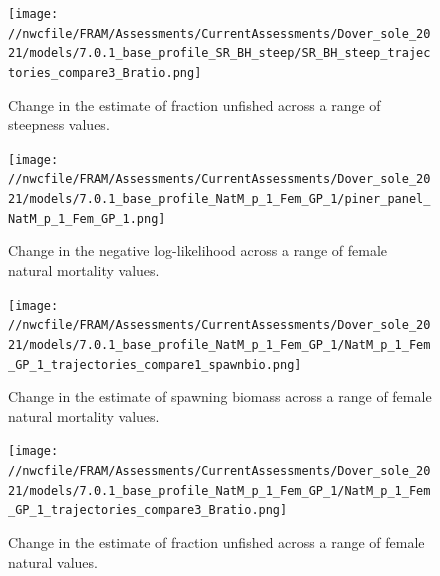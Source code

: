 \documentclass[11pt,
  english,
  a4paper,
]{article}
\begin{document}
\tagmcend\tagstructend


\begin{figure}
\centering
\texttt{[image: //nwcfile/FRAM/Assessments/CurrentAssessments/Dover\_sole\_2021/models/7.0.1\_base\_profile\_SR\_BH\_steep/SR\_BH\_steep\_trajectories\_compare3\_Bratio.png]}
\caption{Change in the estimate of fraction unfished across a range of steepness values.\label{fig:h-depl}}
\end{figure}

\tagmcend\tagstructend


\begin{figure}
\centering
\texttt{[image: //nwcfile/FRAM/Assessments/CurrentAssessments/Dover\_sole\_2021/models/7.0.1\_base\_profile\_NatM\_p\_1\_Fem\_GP\_1/piner\_panel\_NatM\_p\_1\_Fem\_GP\_1.png]}
\caption{Change in the negative log-likelihood across a range of female natural mortality values.\label{fig:m-profile}}
\end{figure}

\tagmcend\tagstructend


\begin{figure}
\centering
\texttt{[image: //nwcfile/FRAM/Assessments/CurrentAssessments/Dover\_sole\_2021/models/7.0.1\_base\_profile\_NatM\_p\_1\_Fem\_GP\_1/NatM\_p\_1\_Fem\_GP\_1\_trajectories\_compare1\_spawnbio.png]}
\caption{Change in the estimate of spawning biomass across a range of female natural mortality values.\label{fig:m-ssb}}
\end{figure}

\tagmcend\tagstructend


\begin{figure}
\centering
\texttt{[image: //nwcfile/FRAM/Assessments/CurrentAssessments/Dover\_sole\_2021/models/7.0.1\_base\_profile\_NatM\_p\_1\_Fem\_GP\_1/NatM\_p\_1\_Fem\_GP\_1\_trajectories\_compare3\_Bratio.png]}
\caption{Change in the estimate of fraction unfished across a range of female natural values.\label{fig:m-depl}}
\end{figure}
\end{document}
